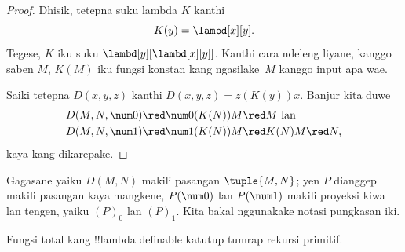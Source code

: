 \documentclass[../../../include/open-logic-section]{subfiles}
\begin{document}
\begin{proof}
Dhisik, tetepna suku lambda $K$ kanthi
\[
K(y) = \lambd[x][y].
\]
Tegese, $K$ iku suku
$\lambd[y][\lambd[x][y]]$.
Kanthi cara ndeleng liyane, kanggo saben
$M$, $K(M)$ iku fungsi konstan kang
ngasilake~$M$ kanggo input apa wae.

Saiki tetepna $D(x,y,z)$ kanthi
$D(x,y,z) = z (K(y))x$. Banjur kita duwe
\begin{align*}
D(M,N,\num 0) & \red \num 0 (K(N)) M \red M \text{ lan}\\
D(M,N,\num 1) & \red \num 1 (K(N)) M \red K(N) M \red N,
\end{align*}
kaya kang dikarepake.
\end{proof}

Gagasane yaiku $D(M,N)$ makili pasangan
$\tuple{M, N}$; yen $P$ dianggep makili
pasangan kaya mangkene, $P(\num 0)$
lan $P(\num 1)$ makili proyeksi kiwa lan
tengen, yaiku $(P)_0$ lan $(P)_1$.
Kita bakal nggunakake notasi pungkasan iki.

\begin{lem}
Fungsi total kang !!{lambda definable}
katutup tumrap rekursi primitif.
\end{lem}
\end{document}
